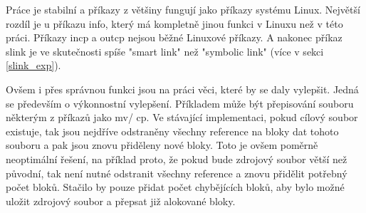 \documentclass[12pt]{report}
\begin{document}
Práce je stabilní a příkazy z většiny fungují jako příkazy systému Linux. Největší rozdíl je u příkazu
info, který má kompletně jinou funkci v Linuxu než v této práci. Příkazy incp a outcp nejsou běžné
Linuxové příkazy. A nakonec příkaz slink je ve skutečnosti spíše "smart link" než "symbolic link" 
(více v sekci \ref{slink_exp}).

Ovšem i přes správnou funkci jsou na práci věci, které by se daly vylepšit. 
Jedná se především o výkonnostní vylepšení. Příkladem může
být přepisování souboru některým z příkazů jako mv/ cp. Ve stávající implementaci, pokud cílový soubor
existuje, tak jsou nejdříve odstraněny všechny reference na bloky dat tohoto souboru a pak jsou znovu
přiděleny nové bloky. Toto je ovšem poměrně neoptimální řešení, na příklad proto, že pokud bude zdrojový
soubor větší než původní, tak není nutné odstranit všechny reference a znovu přidělit potřebný počet 
bloků. Stačilo by pouze přidat počet chybějících bloků, aby bylo možné uložit zdrojový soubor a přepsat již
alokované bloky.
\end{document}
